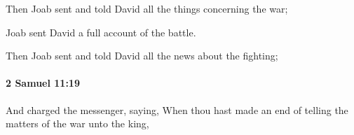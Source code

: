 			\begin{versebox}
					\item[BHS] 
					\item[ASV] Then Joab sent and told David all the things concerning the war;
					\item[NIV] Joab sent David a full account of the battle.
					\item[NRSV] Then Joab sent and told David all the news about the fighting;
			\end{versebox}

		\paragraph{2 Samuel 11:19} %
			\label{2SAMUEL-11-19}

			And charged the messenger, saying, When thou hast made an end of telling the matters of the war unto the king,

